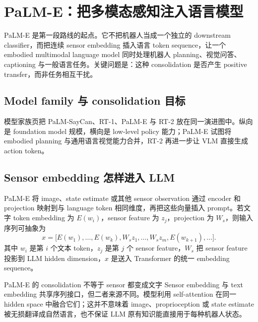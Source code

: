 \section{PaLM-E：把多模态感知注入语言模型}

PaLM-E 是第一段路线的起点。它不把机器人当成一个独立的 downstream classifier，而把连续 sensor embedding 插入语言 token sequence，让一个 embodied multimodal language model 同时处理机器人 planning、视觉问答、captioning 与一般语言任务。关键问题是：这种 consolidation 是否产生 positive transfer，而非任务相互干扰。

\subsection{Model family 与 consolidation 目标}

模型家族页把 PaLM-SayCan、RT-1、PaLM-E 与 RT-2 放在同一演进图中。纵向是 foundation model 规模，横向是 low-level policy 能力；PaLM-E 试图将 embodied planning 与通用语言视觉能力合并，RT-2 再进一步让 VLM 直接生成 action token。



\subsection{Sensor embedding 怎样进入 LLM}

PaLM-E 将 image、state estimate 或其他 sensor observation 通过 encoder 和 projection 映射到与 language token 相同维度，再把这些向量插入 prompt。若文字 token embedding 为 $E(w_i)$，sensor feature 为 $z_j$，projection 为 $W_s$，则输入序列可抽象为
$$
x=\big[E(w_1),\ldots,E(w_k),W_sz_1,\ldots,W_sz_m,E(w_{k+1}),\ldots\big].
$$
其中 $w_i$ 是第 $i$ 个文本 token，$z_j$ 是第 $j$ 个 sensor feature，$W_s$ 把 sensor feature 投影到 LLM hidden dimension，$x$ 是送入 Transformer 的统一 embedding sequence。


\begin{importantbox}{PaLM-E 的 consolidation 不等于 sensor 都变成文字}
Sensor embedding 与 text embedding 共享序列接口，但二者来源不同。模型利用 self-attention 在同一 hidden space 中融合它们；这并不意味着 image、proprioception 或 state estimate 被无损翻译成自然语言，也不保证 LLM 原有知识能直接用于每种机器人状态。
\end{importantbox}

